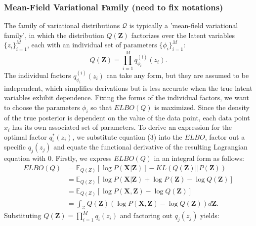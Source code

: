 \documentclass[a4paper,12pt]{article}
\numberwithin{equation}{section}
\begin{document}
\subsubsection{Mean-Field Variational Family (need to fix notations)}
The family of variational distributions $\mathcal{Q}$ is typically a 'mean-field variational family', in which the distribution $Q(\textbf{Z})$ factorizes over the latent variables $\{z_i\}^M_{i=1}$, each with an individual set of parameters $\{\phi_i\}^M_{i=1}$:
\begin{equation}
Q(\textbf{Z})=\prod^M_{i=1}q^{(i)}_{\phi_i}(z_i).
\end{equation}
The individual factors $q^{(i)}_{\phi_i}(z_i)$ can take any form, but they are assumed to be independent, which simplifies derivations but is less accurate when the true latent variables exhibit dependence. Fixing the forms of the individual factors, we want to choose the parameters $\phi_i$ so that $ELBO(Q)$ is maximized. Since the density of the true posterior is dependent on the value of the data point, each data point $x_i$ has its own associated set of parameters. To derive an expression for the optimal factor $q_i^*(z_i)$, we substitute equation (3) into the $ELBO$, factor out a specific $q_j(z_j)$ and equate the functional derivative of the resulting Lagrangian equation with 0. Firstly, we express $ELBO(Q)$ in an integral form as follows:
\begin{align*}
ELBO(Q)&= \mathbb{E}_{Q(Z)}[\log P(\textbf{X}|\textbf{Z})]-KL(Q(\textbf{Z})||P(\textbf{Z}))\\
&= \mathbb{E}_{Q(Z)}[\log P(\textbf{X}|\textbf{Z})+\log P(\textbf{Z})-\log Q(\textbf{Z})]\\
&= \mathbb{E}_{Q(Z)}[\log P(\textbf{X}, \textbf{Z})-\log Q(\textbf{Z})]\\
&= \int_{\mathcal{Z}}Q(\textbf{Z})(\log P(\textbf{X},\textbf{Z})-\log Q(\textbf{Z}))d\textbf{Z}.
\end{align*}
Substituting $Q(\textbf{Z})=\prod^M_{i=1}q_i(z_i)$ and factoring out $q_j(z_j)$ yields:
\end{document}
